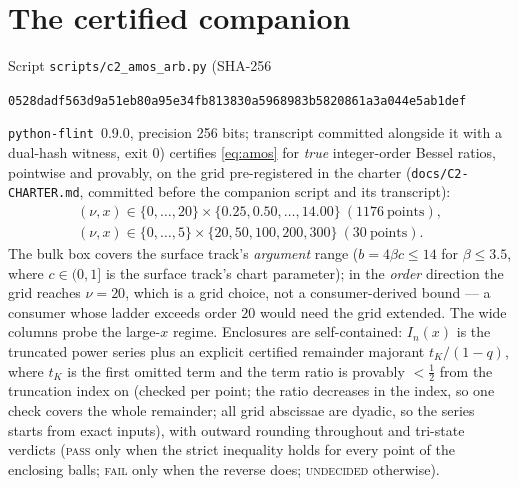 \documentclass[11pt]{article}
\newcommand{\lean}[1]{\texttt{#1}}
\begin{document}
\section{The certified companion}\label{sec:certified}

Script \lean{scripts/c2\_amos\_arb.py} (SHA-256
\begin{center}\small
\lean{0528dadf563d9a51eb80a95e34fb813830a5968983b5820861a3a044e5ab1def}
\end{center}
\noindent \lean{python-flint}~0.9.0, precision 256 bits; transcript
committed alongside it with a dual-hash witness, exit 0) certifies
\eqref{eq:amos} for \emph{true} integer-order Bessel ratios,
pointwise and provably, on the grid pre-registered in the charter
(\lean{docs/C2-CHARTER.md}, committed before the companion script and
its transcript):
\begin{gather*}
(\nu, x) \in \{0,\dots,20\} \times \{0.25, 0.50, \dots, 14.00\}
\ (1176\ \text{points}),\\
(\nu, x) \in \{0,\dots,5\} \times \{20,50,100,200,300\}
\ (30\ \text{points}).
\end{gather*}
The bulk box covers the surface track's \emph{argument} range
($b = 4\beta c \le 14$ for $\beta \le 3.5$, where $c \in (0,1]$ is
the surface track's chart parameter); in the \emph{order} direction
the grid reaches $\nu = 20$, which is a grid choice, not a
consumer-derived bound --- a consumer whose ladder exceeds order
$20$ would need the grid extended.  The wide columns probe the
large-$x$ regime.  Enclosures are self-contained: $I_n(x)$ is the
truncated power series plus an explicit certified remainder majorant
$t_K/(1-q)$, where $t_K$ is the first omitted term and the term
ratio is provably $< \tfrac12$ from the truncation index on (checked
per point; the ratio decreases in the index, so one check covers the
whole remainder; all grid abscissae are dyadic, so the series starts
from exact inputs), with outward rounding throughout and tri-state
verdicts (\textsc{pass} only when the strict inequality holds for
every point of the enclosing balls; \textsc{fail} only when the
reverse does; \textsc{undecided} otherwise).
\end{document}
